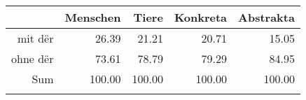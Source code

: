 \begin{tabular}{rrrrr}
  \lsptoprule
 & Menschen & Tiere & Konkreta & Abstrakta \\ 
  \midrule
mit dër & 26.39 & 21.21 & 20.71 & 15.05 \\ 
  ohne dër & 73.61 & 78.79 & 79.29 & 84.95 \\ 
  Sum & 100.00 & 100.00 & 100.00 & 100.00 \\ 
   \lspbottomrule
\end{tabular}
